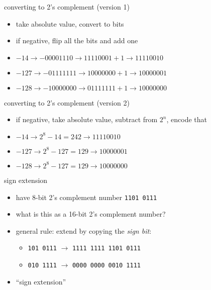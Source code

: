 \begin{frame}{converting to 2's complement (version 1)}
\begin{itemize}
\item take absolute value, convert to bits
\item if negative, flip all the bits and add one
\vspace{.5cm}
\item $-14 \rightarrow -00001110 \rightarrow 11110001 + 1 \rightarrow  11110010$
\item $-127 \rightarrow -01111111 \rightarrow 10000000 + 1 \rightarrow 10000001$
\item $-128 \rightarrow -10000000 \rightarrow 01111111 + 1 \rightarrow 10000000$
\end{itemize}
\end{frame}

\begin{frame}{converting to 2's complement (version 2)}
\begin{itemize}
\item if negative, take absolute value, subtract from $2^n$, encode that
\item $-14 \rightarrow 2^8 - 14 = 242 \rightarrow 11110010$
\item $-127 \rightarrow 2^8 - 127 = 129 \rightarrow 10000001$
\item $-128 \rightarrow 2^8 - 127 = 129 \rightarrow 10000000$
\end{itemize}
\end{frame}

\begin{frame}{sign extension}
    \begin{itemize}
        \item have 8-bit 2's complement number {\tt 1101 0111}
        \item what is this as a 16-bit 2's complement number?
        \vspace{.5cm}
        \item<2> general rule: extend by copying the \textit{sign bit}:
            \begin{itemize}
                \item {\tt {}101 0111} $\rightarrow$ {\tt 1111 1111 1101 0111}
                \item {\tt {}010 1111} $\rightarrow$ {\tt 0000 0000 0010 1111}
            \end{itemize}
        \item<2> ``sign extension''
    \end{itemize}
\end{frame}



